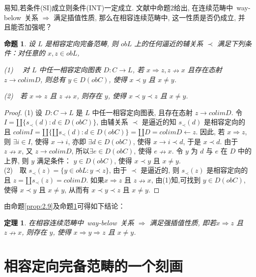 \documentclass[c5size,a4paper,hyperref,fancyhdr,UTF8,fontset=fandol]{ctexart}
\theoremstyle{nonumberplain}
\newtheorem{proof}{证明}
\newtheorem{theorem}[definition]{定理}
\newtheorem{proposition}[definition]{命题}
\theoremstyle{nonumberplain}
\newtheorem{proof}{证}
\begin{document}
易知,若条件(SI)成立则条件(INT)一定成立. 文献\cite{r4}中命题2给出, 在连续范畴中~way-below~关系 $\Rightarrow$ 满足插值性质, 那么在相容连续范畴中, 这一性质是否仍成立, 并且能否加强呢？

\begin{proposition}\label{prop:2.10}
  设 $L$ 是相容定向完备范畴, 则 $obL$ 上的任何逼近的辅关系 $\prec$ 满足下列条件：对任意的 $x,z\in obL$, \par(1)~~ 对 $L$ 中任一相容定向图表 $D:C\rightarrow L$, 若 $x\Rightarrow z, z\nrightarrow x$ 且存在态射 $z\rightarrow colim D$, 则总有 $y\in D(obC)$, 使得 $x\prec y$ 且 $x\neq y$.
  \par(2)~~若 $x\Rightarrow z$ 且 $z\nrightarrow x$, 则存在 $y$, 使得 $x\prec y\prec z$ 且 $x\neq y$.
\end{proposition}

\begin{proof}
  (1) 设 $D:C\rightarrow L$ 是 $L$ 中任一相容定向图表, 且存在态射 $z\rightarrow colim D$. 令 $I=\amalg\{s_{\prec}(d):d\in D(obC)\}$, 由辅关系 $\prec$ 是逼近的知 $s_{\prec}(d)$ 是相容定向的且 $colim I=\amalg\{\amalg s_{\prec}(d):d\in D(obC)\}=\amalg D=colim D\leftarrow z$. 因此, 若 $x\Rightarrow z$, 则 $\exists i\in I$, 使得 $x\rightarrow i$, 亦即 $\exists d\in D(obC)$, 使得 $x\rightarrow i\prec d$, 于是 $x\prec d$. 由于 $z\nrightarrow x$, 又 $z\rightarrow colim D$, 所以$\exists e\in D(obC)$, 使得  $e\nrightarrow x$. 令 $y$ 为 $d$ 与 $e$ 在 $D$ 中的上界, 则 $y$ 满足条件： $y\in D(obC)$, 使得 $x\prec y$ 且 $x\neq y$.\\
  (2)~~取 $s_{\prec}(z)=\{y\in obL:y\prec z\}$, 由于 $\prec$ 是逼近的, 则 $s_{\prec}(z)$ 是相容定向的且 $z=\amalg s_{\prec}(z)=colim D$. 如果$x\Rightarrow z$ 且 $z\nrightarrow x$, 由(1)知,可找到 $y\in D(obC)$, 使得 $x\prec y$ 且 $x\neq y$, 从而有 $x\prec y\prec z$ 且 $x\neq y$.
\end{proof}

由命题\ref{prop:2.9}及命题\ref{prop:2.10}可得如下结论：

\begin{theorem}
  在相容连续范畴中~way-below~关系 $\Rightarrow$ 满足强插值性质, 即若$x\Rightarrow z$ 且
$z\nrightarrow x$, 则存在 $y$, 使得 $x\Rightarrow y\Rightarrow z$ 且 $x\neq y$.
\end{theorem}

\section{相容定向完备范畴的一个刻画}
\end{document}

